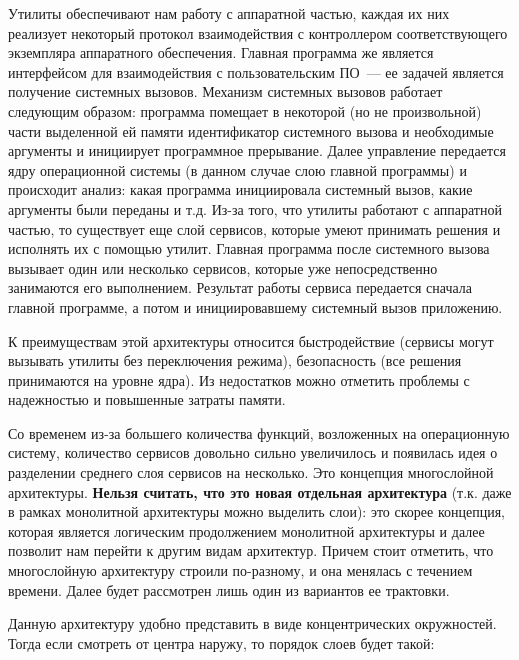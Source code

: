 Утилиты обеспечивают нам работу с аппаратной частью, каждая их них реализует
некоторый протокол взаимодействия с контроллером соответствующего экземпляра
аппаратного обеспечения. Главная программа же является интерфейсом для
взаимодействия с пользовательским ПО~--- ее задачей является получение системных
вызовов. Механизм системных вызовов работает следующим образом: программа
помещает в некоторой (но не произвольной) части выделенной ей памяти
идентификатор системного вызова и необходимые аргументы и инициирует программное
прерывание. Далее управление передается ядру операционной системы (в данном
случае слою главной программы) и происходит анализ: какая программа инициировала
системный вызов, какие аргументы были переданы и т.д. Из-за того, что утилиты
работают с аппаратной частью, то существует еще слой сервисов, которые умеют
принимать решения и исполнять их с помощью утилит. Главная программа после
 системного вызова вызывает один или несколько сервисов,
которые уже непосредственно занимаются его выполнением. Результат работы сервиса
передается сначала главной программе, а потом и инициировавшему системный вызов
приложению.

К преимуществам этой архитектуры относится быстродействие (сервисы могут
вызывать утилиты без переключения режима), безопасность (все решения принимаются
на уровне ядра). Из недостатков можно отметить проблемы с надежностью и
повышенные затраты памяти.


Со временем из-за большего количества функций, возложенных на операционную
систему, количество сервисов довольно сильно увеличилось и появилась идея о
разделении среднего слоя сервисов на несколько. Это концепция многослойной
архитектуры. \textbf{Нельзя считать, что это новая отдельная архитектура} (т.к.
даже в рамках монолитной архитектуры можно выделить слои): это скорее концепция,
которая является логическим продолжением монолитной архитектуры и далее позволит
нам перейти к другим видам архитектур. Причем стоит отметить, что многослойную
архитектуру строили по-разному, и она менялась с течением времени. Далее будет
рассмотрен лишь один из вариантов ее трактовки.

Данную архитектуру удобно представить в виде концентрических окружностей. Тогда
если смотреть от центра наружу, то порядок слоев будет такой:


